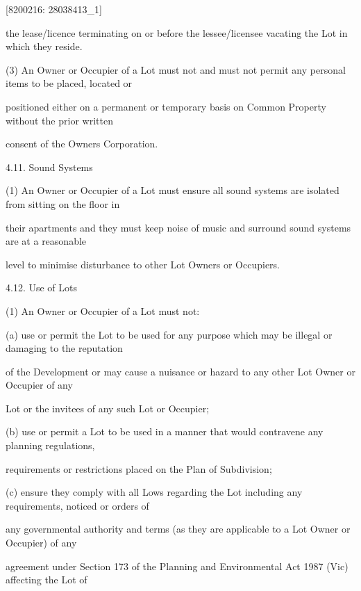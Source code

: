 \documentclass{article}
\begin{document}
{\fontsize{7.02}{1}[8200216: 28038413\_1] }

{\fontsize{10.02}{1}the lease/licence terminating on or before the lessee/licensee vacating the Lot in which they reside. }

{\fontsize{9.962}{1}(3) An Owner or Occupier of a Lot must not and must not permit any personal items to be placed, located or }

{\fontsize{10.02}{1}positioned either on a permanent or temporary basis on Common Property without the prior written }

{\fontsize{10.02}{1}consent of the Owners Corporation. }

{\fontsize{9.99}{1}4.11. Sound Systems }

{\fontsize{9.962}{1}(1) An Owner or Occupier of a Lot must ensure all sound systems are isolated from sitting on the floor in }

{\fontsize{10.02}{1}their apartments and they must keep noise of music and surround sound systems are at a reasonable }

{\fontsize{10.02}{1}level to minimise disturbance to other Lot Owners or Occupiers. }

{\fontsize{9.99}{1}4.12. Use of Lots }

{\fontsize{9.962}{1}(1) An Owner or Occupier of a Lot must not: }

{\fontsize{9.962}{1}(a) use or permit the Lot to be used for any purpose which may be illegal or damaging to the reputation }

{\fontsize{10.02}{1}of the Development or may cause a nuisance or hazard to any other Lot Owner or Occupier of any }

{\fontsize{10.02}{1}Lot or the invitees of any such Lot or Occupier; }

{\fontsize{9.962}{1}(b) use or permit a Lot to be used in a manner that would contravene any planning regulations, }

{\fontsize{10.02}{1}requirements or restrictions placed on the Plan of Subdivision; }

{\fontsize{9.962}{1}(c) ensure they comply with all Lows regarding the Lot including any requirements, noticed or orders of }

{\fontsize{10.02}{1}any governmental authority and terms (as they are applicable to a Lot Owner or Occupier) of any }

{\fontsize{10.02}{1}agreement under Section 173 of the Planning and Environmental Act 1987 (Vic) affecting the Lot of }
\end{document}
